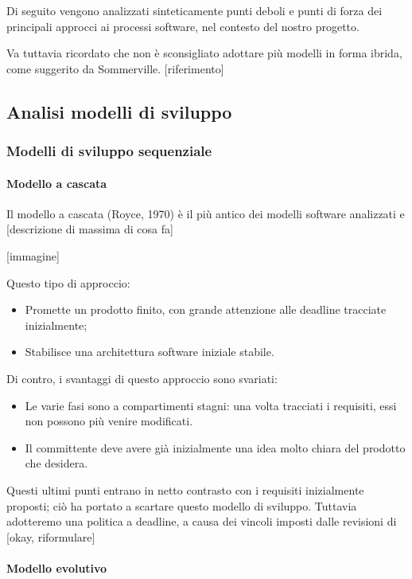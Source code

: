 	Di seguito vengono analizzati sinteticamente punti deboli e punti di forza dei principali approcci ai processi software, nel contesto del nostro progetto.
	
	Va tuttavia ricordato che non è sconsigliato adottare più modelli in forma ibrida, come suggerito da Sommerville. [riferimento]

	\subsection{Analisi modelli di sviluppo}

		\subsubsection{Modelli di sviluppo sequenziale}

			\paragraph{Modello a cascata}

			Il modello a cascata (Royce, 1970) è il più antico dei modelli software analizzati e [descrizione di massima di cosa fa]

			[immagine]

			Questo tipo di approccio:
\begin{itemize}
\item Promette un prodotto finito, con grande attenzione alle deadline tracciate inizialmente;
\item Stabilisce una architettura software iniziale stabile.
\end{itemize}

			Di contro, i svantaggi di questo approccio sono svariati:
\begin{itemize}
\item Le varie fasi sono a compartimenti stagni: una volta tracciati i requisiti, essi non possono più venire modificati.
\item Il committente deve avere già inizialmente una idea molto chiara del prodotto che desidera. 
\end{itemize}

Questi ultimi punti entrano in netto contrasto con i requisiti inizialmente proposti; ciò ha portato a scartare questo modello di sviluppo. Tuttavia adotteremo una politica a deadline, a causa dei vincoli imposti dalle revisioni di {\TV} [okay, riformulare]

			\paragraph{Modello evolutivo}

